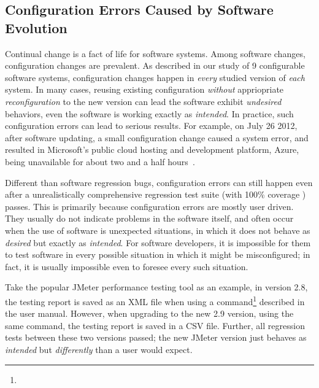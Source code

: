 \subsection{Configuration Errors Caused by Software Evolution}

Continual change is a fact of life for software systems.
Among software changes, configuration changes are prevalent.
As described in our study of 9 configurable software systems,
configuration changes happen in \textit{every} studied
version of \textit{each} system. In many
cases, reusing existing configuration \textit{without} appriopriate
\textit{reconfiguration} to the new
version can lead the software exhibit \textit{undesired} behaviors,
even the software is working exactly as \textit{intended}.
In practice, such configuration errors can lead to serious results.
For example, on July 26 2012, after software updating,
a small configuration change caused a system error, and resulted in
Microsoft's public cloud hosting and development platform, Azure,
being unavailable for about two and a half hours~\cite{msdown}.


Different than software regression bugs, configuration errors
can still happen even after a unrealistically comprehensive
regression test suite (with 100\% coverage ) passes. This is primarily
because configuration errors are mostly user driven.
They usually do not indicate problems in the software itself, and
often occur when the use of software is unexpected
situations, in which it does not behave as \textit{desired} but
exactly as \textit{intended}. For software developers,
it is impossible for them to test software in every possible
situation in which it might be misconfigured; in fact, it is usually
impossible even to foresee every such situation. 


Take the popular JMeter performance testing tool as an example, 
in version 2.8, the testing report is saved as an XML
file when using a command\footnote{} described in the user manual.
However, when upgrading to the new 2.9 version, 
using the same command, the testing report is saved
in a CSV file. Further, all regression tests between
these two versions passed; the new JMeter version
just behaves as \textit{intended} but \textit{differently}
than a user would expect.


